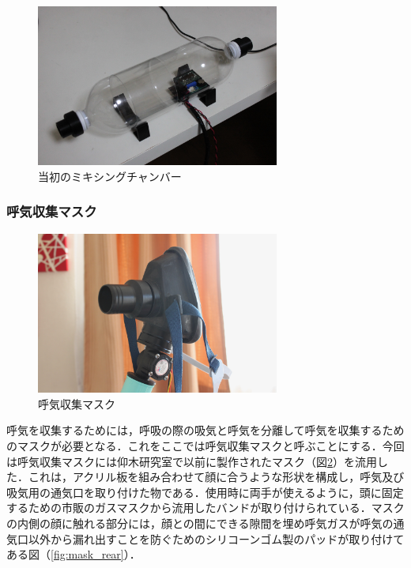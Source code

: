 \begin{figure}[H]
  \begin{center}
    \includegraphics[width=8cm]{fig/mixing_chamber_early}
    \caption{当初のミキシングチャンバー}
    \label{fig:mixing_chamber_early}
  \end{center}
\end{figure}

\subsubsection{呼気収集マスク}

\begin{figure}[H]
  \begin{center}
    \includegraphics[width=8cm]{fig/mask_front}
    \caption{呼気収集マスク}
    \label{fig:mask_front}
  \end{center}
\end{figure}

呼気を収集するためには，呼吸の際の吸気と呼気を分離して呼気を収集するためのマスクが必要となる．これをここでは呼気収集マスクと呼ぶことにする．今回は呼気収集マスクには仰木研究室で以前に製作されたマスク（図\ref{fig:mask_front}）を流用した．これは，アクリル板を組み合わせて顔に合うような形状を構成し，呼気及び吸気用の通気口を取り付けた物である．使用時に両手が使えるように，頭に固定するための市販のガスマスクから流用したバンドが取り付けられている．マスクの内側の顔に触れる部分には，顔との間にできる隙間を埋め呼気ガスが呼気の通気口以外から漏れ出すことを防ぐためのシリコーンゴム製のパッドが取り付けてある図（\ref{fig:mask_rear}）．

